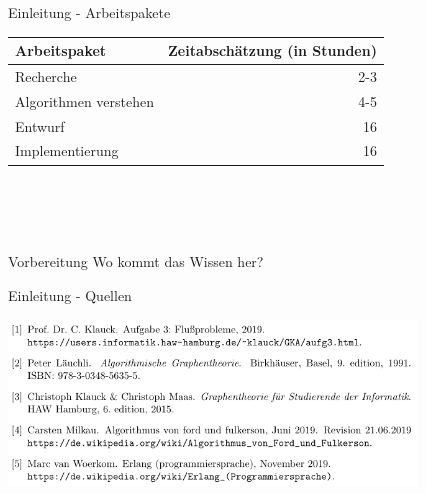 \documentclass{beamer}
\begin{document}
    \begin{frame}{Einleitung - Arbeitspakete}
        \begin{center}
            \begin{tabular}{l | r}
                Arbeitspaket & Zeitabsch\"atzung (in Stunden) \\
                \hline
                Recherche & 2-3\\
                Algorithmen verstehen & 4-5\\
                Entwurf & 16\\
                Implementierung & 16
            \end{tabular}
        \end{center}

        \\~\\~\\

        \begin{block}{Vorbereitung}
            Wo kommt das Wissen her?
        \end{block}
    \end{frame}

    \begin{frame}{Einleitung - Quellen}
        \begin{center}
            \includegraphics[height=4.4cm]{../quellen.PNG}
        \end{center}
    \end{frame}
\end{document}

